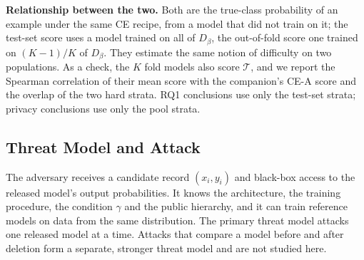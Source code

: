 \documentclass{article} %
\newcommand{\cn}[1]{\textsc{#1}}
\newcommand{\testset}{\mathcal{T}}
\begin{document}
\textbf{Relationship between the two.} Both are the true-class probability of an example under the same \cn{CE} recipe, from a model that did not train on it; the test-set score uses a model trained on all of $D_\beta$, the out-of-fold score one trained on $(K-1)/K$ of $D_\beta$. They estimate the same notion of difficulty on two populations. As a check, the $K$ fold models also score $\testset$, and we report the Spearman correlation of their mean score with the companion's \cn{CE-A} score and the overlap of the two hard strata. RQ1 conclusions use only the test-set strata; privacy conclusions use only the pool strata.

\subsection{Threat Model and Attack}
\label{sec:threat}

The adversary receives a candidate record $(x_i,y_i)$ and black-box access to the released model's output probabilities. It knows the architecture, the training procedure, the condition $\gamma$ and the public hierarchy, and it can train reference models on data from the same distribution. The primary threat model attacks one released model at a time. Attacks that compare a model before and after deletion form a separate, stronger threat model and are not studied here.
\end{document}
